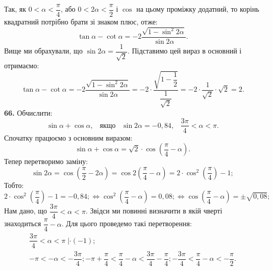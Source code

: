Так, як $0<\alpha<\dfrac{\pi}{4}$, або $0<2\alpha<\dfrac{\pi}{2}$ і $\cos$ на цьому проміжку додатний, то корінь квадратний потрібно брати зі знаком плюс, отже:
$$
\tan\alpha-\cot\alpha=
-2\dfrac{\sqrt{1-\sin^2 2\alpha}}{\sin2\alpha}.
$$
Вище ми обрахували, що $\sin2\alpha=\dfrac{1}{\sqrt{2}}$. Підставимо цей вираз в основний і отримаємо:
$$
\tan\alpha-\cot\alpha=
-2\dfrac{\sqrt{1-\sin^2 2\alpha}}{\sin2\alpha}=
-2\cdot\dfrac{\sqrt{1-\dfrac{1}{2}}}{\dfrac{1}{\sqrt{2}}}=-2\cdot\dfrac{1}{\sqrt{2}}\cdot\sqrt{2}=2.
$$
\textbf{66.} Обчислити:
$$
\sin\alpha+\cos\alpha, \;\;\; \mbox{якщо} \;\;\; \sin2\alpha=-0,84, \;\;\; \dfrac{3\pi}{4}<\alpha<\pi.
$$
Спочатку працюємо з основним виразом:
$$
\sin\alpha+\cos\alpha=\sqrt{2}\cdot\cos\left(\dfrac{\pi}{4}-\alpha\right).
$$
Тепер перетворимо заміну:
$$
\sin2\alpha=\cos\left(\dfrac{\pi}{2}-2\alpha\right)=\cos2\left(\dfrac{\pi}{4}-\alpha\right)=
2\cdot\cos^2\left(\dfrac{\pi}{4}\right)-1;
$$
Тобто:
$$
2\cdot\cos^2\left(\dfrac{\pi}{4}\right)-1=-0,84;
\Leftrightarrow
\cos^2\left(\dfrac{\pi}{4}-\alpha\right)=0,08;
\Leftrightarrow
\cos\left(\dfrac{\pi}{4}-\alpha\right)=\pm\sqrt{0,08};
$$
Нам дано, що $\dfrac{3\pi}{4}<\alpha<\pi$. Звідси ми повинні визначити в якій чверті знаходиться $\dfrac{\pi}{4}-\alpha$. Для цього проведемо такі перетворення:
\begin{gather*}
\dfrac{3\pi}{4}<\alpha<\pi \; \left|\cdot(-1);\\
-\pi<-\alpha<-\dfrac{3\pi}{4};
-\pi+\dfrac{\pi}{4}<\dfrac{\pi}{4}-\alpha<\dfrac{3\pi}{4}-\dfrac{\pi}{4};
-\dfrac{3\pi}{4}<\dfrac{\pi}{4}-\alpha<-\dfrac{\pi}{2}.
\end{gather*}

